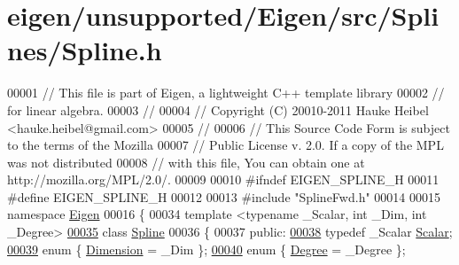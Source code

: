 \hypertarget{eigen_2unsupported_2_eigen_2src_2_splines_2_spline_8h_source}{}\section{eigen/unsupported/\+Eigen/src/\+Splines/\+Spline.h}
\label{eigen_2unsupported_2_eigen_2src_2_splines_2_spline_8h_source}

\begin{DoxyCode}
00001 \textcolor{comment}{// This file is part of Eigen, a lightweight C++ template library}
00002 \textcolor{comment}{// for linear algebra.}
00003 \textcolor{comment}{//}
00004 \textcolor{comment}{// Copyright (C) 20010-2011 Hauke Heibel <hauke.heibel@gmail.com>}
00005 \textcolor{comment}{//}
00006 \textcolor{comment}{// This Source Code Form is subject to the terms of the Mozilla}
00007 \textcolor{comment}{// Public License v. 2.0. If a copy of the MPL was not distributed}
00008 \textcolor{comment}{// with this file, You can obtain one at http://mozilla.org/MPL/2.0/.}
00009 
00010 \textcolor{preprocessor}{#ifndef EIGEN\_SPLINE\_H}
00011 \textcolor{preprocessor}{#define EIGEN\_SPLINE\_H}
00012 
00013 \textcolor{preprocessor}{#include "SplineFwd.h"}
00014 
00015 \textcolor{keyword}{namespace }\hyperlink{namespace_eigen}{Eigen}
00016 \{
00034   \textcolor{keyword}{template} <\textcolor{keyword}{typename} \_Scalar, \textcolor{keywordtype}{int} \_Dim, \textcolor{keywordtype}{int} \_Degree>
\hyperlink{group___splines___module}{00035}   \textcolor{keyword}{class }\hyperlink{group___splines___module_class_eigen_1_1_spline}{Spline}
00036   \{
00037   \textcolor{keyword}{public}:
\hyperlink{group___splines___module_a8cafd78b564825c76fbb3419653d9742}{00038}     \textcolor{keyword}{typedef} \_Scalar \hyperlink{group___splines___module_a8cafd78b564825c76fbb3419653d9742}{Scalar}; 
\hyperlink{group___splines___module_a82c233f1d4719bc52397d64a6c96c5b0a25366e5e79da5355d259a71096d8d8a7}{00039}     \textcolor{keyword}{enum} \{ \hyperlink{group___splines___module_a82c233f1d4719bc52397d64a6c96c5b0a25366e5e79da5355d259a71096d8d8a7}{Dimension} = \_Dim  \};
\hyperlink{group___splines___module_a40cd07294408f87d39763e15b331b4d1a7bc38582fb1bae7db67c89b6c5f45f24}{00040}     \textcolor{keyword}{enum} \{ \hyperlink{group___splines___module_a40cd07294408f87d39763e15b331b4d1a7bc38582fb1bae7db67c89b6c5f45f24}{Degree} = \_Degree  \};

\end{DoxyCode}
